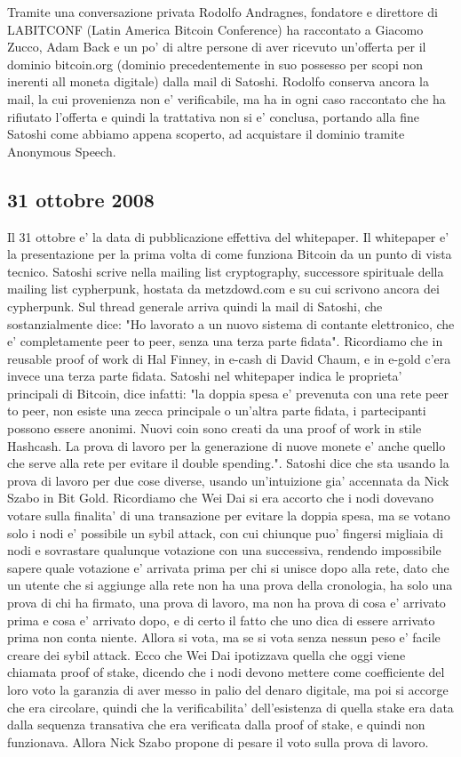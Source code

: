 \documentclass{article}
\begin{document}
Tramite una conversazione privata Rodolfo Andragnes, fondatore e direttore di LABITCONF (Latin America Bitcoin Conference) ha raccontato a Giacomo Zucco, Adam Back e un po' di altre persone di aver ricevuto un'offerta per il dominio bitcoin.org (dominio precedentemente in suo possesso per scopi non inerenti all moneta digitale) dalla mail di Satoshi. Rodolfo conserva ancora la mail, la cui provenienza non e' verificabile, ma ha in ogni caso raccontato che ha rifiutato l'offerta e quindi la trattativa non si e' conclusa, portando alla fine Satoshi come abbiamo appena scoperto, ad acquistare il dominio tramite Anonymous Speech.

\subsection{31 ottobre 2008}
Il 31 ottobre e' la data di pubblicazione effettiva del whitepaper. Il whitepaper e' la presentazione per la prima volta di come funziona Bitcoin da un punto di vista tecnico. Satoshi scrive nella mailing list cryptography, successore spirituale della mailing list cypherpunk, hostata da metzdowd.com e su cui scrivono ancora dei cypherpunk. Sul thread generale arriva quindi la mail di Satoshi, che sostanzialmente dice: "Ho lavorato a un nuovo sistema di contante elettronico, che e' completamente peer to peer, senza una terza parte fidata". Ricordiamo che in reusable proof of work di Hal Finney, in e-cash di David Chaum, e in e-gold c'era invece una terza parte fidata. Satoshi nel whitepaper indica le proprieta' principali di Bitcoin, dice infatti: "la doppia spesa e' prevenuta con una rete peer to peer, non esiste una zecca principale o un'altra parte fidata, i partecipanti possono essere anonimi. Nuovi coin sono creati da una proof of work in stile Hashcash. La prova di lavoro per la generazione di nuove monete e' anche quello che serve alla rete per evitare il double spending.". Satoshi dice che sta usando la prova di lavoro per due cose diverse, usando un'intuizione gia' accennata da Nick Szabo in Bit Gold. Ricordiamo che Wei Dai si era accorto che i nodi dovevano votare sulla finalita' di una transazione per evitare la doppia spesa, ma se votano solo i nodi e' possibile un sybil attack, con cui chiunque puo' fingersi migliaia di nodi e sovrastare qualunque votazione con una successiva, rendendo impossibile sapere quale votazione e' arrivata prima per chi si unisce dopo alla rete, dato che un utente che si aggiunge alla rete non ha una prova della cronologia, ha solo una prova di chi ha firmato, una prova di lavoro, ma non ha prova di cosa e' arrivato prima e cosa e' arrivato dopo, e di certo il fatto che uno dica di essere arrivato prima non conta niente. Allora si vota, ma se si vota senza nessun peso e' facile creare dei sybil attack. Ecco che Wei Dai ipotizzava quella che oggi viene chiamata proof of stake, dicendo che i nodi devono mettere come coefficiente del loro voto la garanzia di aver messo in palio del denaro digitale, ma poi si accorge che era circolare, quindi che la verificabilita' dell'esistenza di quella stake era data dalla sequenza transativa che era verificata dalla proof of stake, e quindi non funzionava. Allora Nick Szabo propone di pesare il voto sulla prova di lavoro. 
\end{document}
